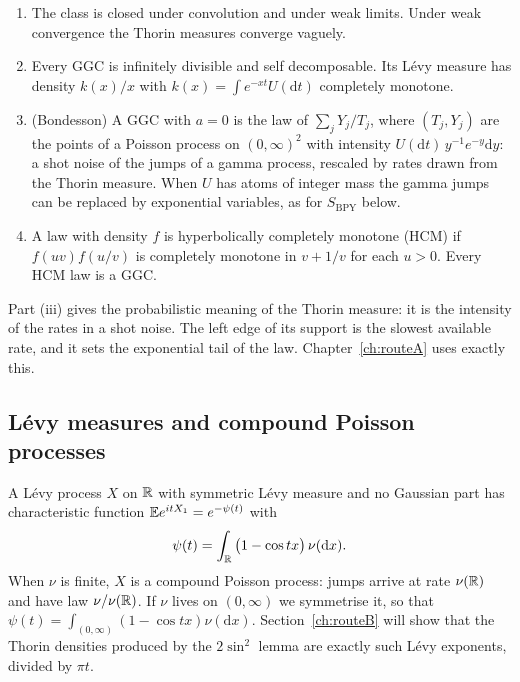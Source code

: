 \begin{proposition}\label{prop:ggcprops}
\begin{enumerate}
\item[(i)] The class is closed under convolution and under weak limits. Under weak convergence the Thorin measures converge vaguely.
\item[(ii)] Every GGC is infinitely divisible and self decomposable. Its L\'evy measure has density $k(x)/x$ with $k(x)=\int e^{-xt}U(\mathrm dt)$ completely monotone.
\item[(iii)] (Bondesson) A GGC with $a=0$ is the law of $\sum_jY_j/T_j$, where $(T_j,Y_j)$ are the points of a Poisson process on $(0,\infty)^2$ with intensity $U(\mathrm dt)\,y^{-1}e^{-y}\mathrm dy$: a shot noise of the jumps of a gamma process, rescaled by rates drawn from the Thorin measure. When $U$ has atoms of integer mass the gamma jumps can be replaced by exponential variables, as for $S_{\mathrm{BPY}}$ below.
\item[(iv)] A law with density $f$ is hyperbolically completely monotone (HCM) if $f(uv)f(u/v)$ is completely monotone in $v+1/v$ for each $u>0$. Every HCM law is a GGC.
\end{enumerate}
\end{proposition}

Part (iii) gives the probabilistic meaning of the Thorin measure: it is the intensity of the rates in a shot noise. The left edge of its support is the slowest available rate, and it sets the exponential tail of the law. Chapter~\ref{ch:routeA} uses exactly this.

\subsection{L\'evy measures and compound Poisson processes}\label{sec:levy}

A L\'evy process $X$ on $\mathbb{R}$ with symmetric L\'evy measure and no Gaussian part has characteristic function $\mathbb{E} e^{itX_1}=e^{-\psi(t)}$ with
\[
\psi(t)=\int_{\mathbb{R}}\big(1-\cos tx\big)\,\nu(\mathrm dx).
\]
When $\nu$ is finite, $X$ is a compound Poisson process: jumps arrive at rate $\nu(\mathbb{R})$ and have law $\nu/\nu(\mathbb{R})$. If $\nu$ lives on $(0,\infty)$ we symmetrise it, so that $\psi(t)=\int_{(0,\infty)}(1-\cos tx)\nu(\mathrm dx)$. Section~\ref{ch:routeB} will show that the Thorin densities produced by the $2\sin^2$ lemma are exactly such L\'evy exponents, divided by $\pi t$.


